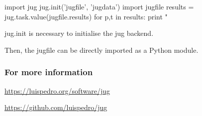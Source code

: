 \documentclass{beamer}
\begin{document}
\begin{frame}[fragile]
\begin{python}
import jug
jug.init('jugfile', 'jugdata')
import jugfile
results = jug.task.value(jugfile.results)
for p,t in results:
        print "%
\end{python}

\alert{jug.init} is necessary to initialise the jug backend.

Then, the \alert{jugfile can be directly imported as a Python module}.

\end{frame}

\begin{frame}[fragile]
\frametitle{For more information}

\href{https://luispedro.org/software/jug}{https://luispedro.org/software/jug}

\href{https://github.com/luispedro/jug}{https://github.com/luispedro/jug}
\end{frame}
\end{document}
